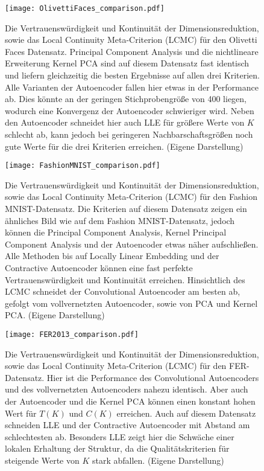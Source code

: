 \begin{figure}[ht]
	\begin{center}
		\texttt{[image: OlivettiFaces\_comparison.pdf]}
	\end{center}
	\caption[Qualitätskriterien für den Olivetti Faces-Datensatz]{Die Vertrauenswürdigkeit und Kontinuität der Dimensionsreduktion, sowie das Local Continuity Meta-Criterion (LCMC) für den Olivetti Faces Datensatz. Principal Component Analysis und die nichtlineare Erweiterung Kernel PCA sind auf diesem Datensatz fast identisch und liefern gleichzeitig die besten Ergebnisse auf allen drei Kriterien. Alle Varianten der Autoencoder fallen hier etwas in der Performance ab. Dies könnte an der geringen Stichprobengröße von 400 liegen, wodurch eine Konvergenz der Autoencoder schwieriger wird. Neben den Autoencoder schneidet hier auch LLE für größere Werte von $K$ schlecht ab, kann jedoch bei geringeren Nachbarschaftsgrößen noch gute Werte für die drei Kriterien erreichen. (Eigene Darstellung)}
	\label{fig:OlivettiFacesMetrics}
\end{figure}

\begin{figure}[ht]
	\begin{center}
		\texttt{[image: FashionMNIST\_comparison.pdf]}
	\end{center}
	\caption[Qualitätskriterien für den Fashion MNIST-Datensatz]{Die Vertrauenswürdigkeit und Kontinuität der Dimensionsreduktion, sowie das Local Continuity Meta-Criterion (LCMC) für den Fashion MNIST-Datensatz. Die Kriterien auf diesem Datensatz zeigen ein ähnliches Bild wie auf dem Fashion MNIST-Datensatz, jedoch können die Principal Component Analysis, Kernel Principal Component Analysis und der Autoencoder etwas näher aufschließen. Alle Methoden bis auf Locally Linear Embedding und der Contractive Autoencoder können eine fast perfekte Vertrauenswürdigkeit und Kontinuität erreichen. Hinsichtlich des LCMC schneidet der Convolutional Autoencoder am besten ab, gefolgt vom vollvernetzten Autoencoder, sowie von PCA und Kernel PCA. (Eigene Darstellung)}
	\label{fig:FashionMNISTMetrics}
\end{figure}

\begin{figure}[ht]
	\begin{center}
		\texttt{[image: FER2013\_comparison.pdf]}
	\end{center}
	\caption[Qualitätskriterien für den FER-Datensatz]{Die Vertrauenswürdigkeit und Kontinuität der Dimensionsreduktion, sowie das Local Continuity Meta-Criterion (LCMC) für den FER-Datensatz. Hier ist die Performance des Convolutional Autoencoders und des vollvernetzten Autoencoders nahezu identisch. Aber auch der Autoencoder und die Kernel PCA können einen konstant hohen Wert für $T(K)$ und $C(K)$ erreichen. Auch auf diesem Datensatz schneiden LLE und der Contractive Autoencoder mit Abstand am schlechtesten ab. Besonders LLE zeigt hier die Schwäche einer lokalen Erhaltung der Struktur, da die Qualitätskriterien für steigende Werte von $K$ stark abfallen. (Eigene Darstellung)}
	\label{fig:FER2013Metrics}
\end{figure}

